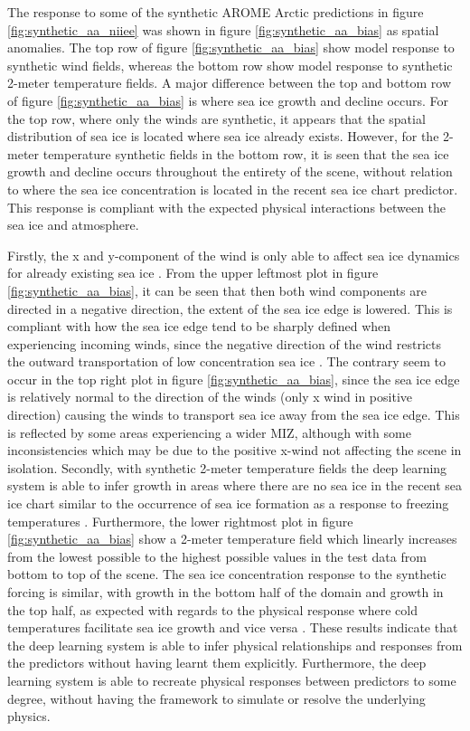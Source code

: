 \documentclass[../main/thesis]{subfiles}
\begin{document}
The response to some of the synthetic AROME Arctic predictions in figure \ref{fig:synthetic_aa_niiee} was shown in figure \ref{fig:synthetic_aa_bias} as spatial anomalies. The top row of figure \ref{fig:synthetic_aa_bias} show model response to synthetic wind fields, whereas the bottom row show model response to synthetic 2-meter temperature fields. A major difference between the top and bottom row of figure \ref{fig:synthetic_aa_bias} is where sea ice growth and decline occurs. For the top row, where only the winds are synthetic, it appears that the spatial distribution of sea ice is located where sea ice already exists. However, for the 2-meter temperature synthetic fields in the bottom row, it is seen that the sea ice growth and decline occurs throughout the entirety of the scene, without relation to where the sea ice concentration is located in the recent sea ice chart predictor. This response is compliant with the expected physical interactions between the sea ice and atmosphere. 

Firstly, the x and y-component of the wind is only able to affect sea ice dynamics for already existing sea ice \citep{Spreen2011, Yu2020}. From the upper leftmost plot in figure \ref{fig:synthetic_aa_bias}, it can be seen that then both wind components are directed in a negative direction, the extent of the sea ice edge is lowered. This is compliant with how the sea ice edge tend to be sharply defined when experiencing incoming winds, since the negative direction of the wind restricts the outward transportation of low concentration sea ice \citep{Yu2020}. The contrary seem to occur in the top right plot in figure \ref{fig:synthetic_aa_bias}, since the sea ice edge is relatively normal to the direction of the winds (only x wind in positive direction) causing the winds to transport sea ice away from the sea ice edge. This is reflected by some areas experiencing a wider MIZ, although with some inconsistencies which may be due to the positive x-wind not affecting the scene in isolation. Secondly, with synthetic 2-meter temperature fields the deep learning system is able to infer growth in areas where there are no sea ice in the recent sea ice chart similar to the occurrence of sea ice formation as a response to freezing temperatures \citep{Hibler1979}. Furthermore, the lower rightmost plot in figure \ref{fig:synthetic_aa_bias} show a 2-meter temperature field which linearly increases from the lowest possible to the highest possible values in the test data from bottom to top of the scene. The sea ice concentration response to the synthetic forcing is similar, with growth in the bottom half of the domain and growth in the top half, as expected with regards to the physical response where cold temperatures facilitate sea ice growth and vice versa \citep{Hibler1979}. These results indicate that the deep learning system is able to infer physical relationships and responses from the predictors without having learnt them explicitly. Furthermore, the deep learning system is able to recreate physical responses between predictors to some degree, without having the framework to simulate or resolve the underlying physics.
\end{document}
